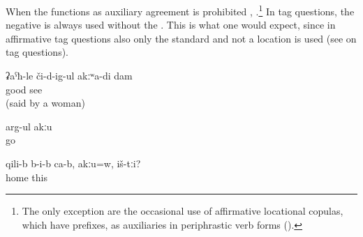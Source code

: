When the  functions as auxiliary  agreement is prohibited , .\footnote{The only exception are the occasional use of affirmative locational copulas, which have  prefixes, as auxiliaries in periphrastic verb forms ().} In tag questions, the negative  is always used without the   . This is what one would expect, since in affirmative tag questions also only the standard  and not a location  is used (see  on tag questions).
%
\begin{exe}
	\ex	\label{ex:I do not see well}
	\gll	ʡaˁħ-le	či-d-ig-ul	akːʷa-di	dam\\
		good	see		\\
	\glt	{} (said by a woman)

	\ex	\label{ex:He is not going (with his friends)}
	\gll	arg-ul	akːu\\
		go	\\
	\glt	{}

	\ex	\label{ex:They are inside the house, aren't they}
	\gll	qili-b	b-i-b	ca-b,	akːu=w,	iš-tːi?\\
		home				this\\
	\glt	{}
\end{exe}

